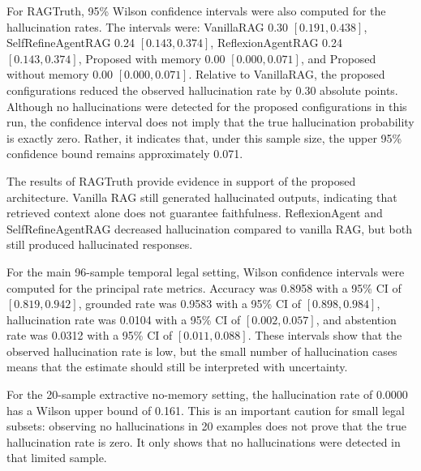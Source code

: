 For RAGTruth, 95\% Wilson confidence intervals were also computed for the hallucination rates. The intervals were: VanillaRAG 0.30 \([0.191, 0.438]\), SelfRefineAgentRAG 0.24 \([0.143, 0.374]\), ReflexionAgentRAG 0.24 \([0.143, 0.374]\), Proposed with memory 0.00 \([0.000, 0.071]\), and Proposed without memory 0.00 \([0.000, 0.071]\). Relative to VanillaRAG, the proposed configurations reduced the observed hallucination rate by 0.30 absolute points. Although no hallucinations were detected for the proposed configurations in this run, the confidence interval does not imply that the true hallucination probability is exactly zero. Rather, it indicates that, under this sample size, the upper 95\% confidence bound remains approximately 0.071.

The results of RAGTruth provide evidence in support of the proposed architecture. Vanilla RAG still generated hallucinated outputs, indicating that retrieved context alone does not guarantee faithfulness. ReflexionAgent and SelfRefineAgentRAG decreased hallucination compared to vanilla RAG, but both still produced hallucinated responses.

For the main 96-sample temporal legal setting, Wilson confidence intervals were computed for the principal rate metrics. Accuracy was 0.8958 with a 95\% CI of \([0.819, 0.942]\), grounded rate was 0.9583 with a 95\% CI of \([0.898, 0.984]\), hallucination rate was 0.0104 with a 95\% CI of \([0.002, 0.057]\), and abstention rate was 0.0312 with a 95\% CI of \([0.011, 0.088]\). These intervals show that the observed hallucination rate is low, but the small number of hallucination cases means that the estimate should still be interpreted with uncertainty.

For the 20-sample extractive no-memory setting, the hallucination rate of 0.0000 has a Wilson upper bound of 0.161. This is an important caution for small legal subsets: observing no hallucinations in 20 examples does not prove that the true hallucination rate is zero. It only shows that no hallucinations were detected in that limited sample.

